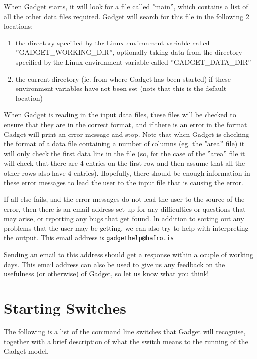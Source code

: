 \documentclass[10pt,twoside]{book}
\begin{document}
\bigskip
When Gadget starts, it will look for a file called ''main'', which contains a list of all the other data files required.  Gadget will search for this file in the following 2 locations:

\begin{enumerate}
\item the directory specified by the Linux environment variable called ''GADGET\_WORKING\_DIR'', optionally taking data from the directory specified by the Linux environment variable called ''GADGET\_DATA\_DIR''
\item the current directory (ie. from where Gadget has been started) if these environment variables have not been set (note that this is the default location)
\end{enumerate}

When Gadget is reading in the input data files, these files will be checked to ensure that they are in the correct format, and if there is an error in the format Gadget will print an error message and stop.  Note that when Gadget is checking the format of a data file containing a number of columns (eg. the ''area'' file) it will only check the first data line in the file (so, for the case of the ''area'' file it will check that there are 4 entries on the first row and then assume that all the other rows also have 4 entries).  Hopefully, there should be enough information in these error messages to lead the user to the input file that is causing the error.

\bigskip
If all else fails, and the error messages do not lead the user to the source of the error, then there is an email address set up for any difficulties or questions that may arise, or reporting any bugs that get found.  In addition to sorting out any problems that the user may be getting, we can also try to help with interpreting the output.  This email address is {\tt gadgethelp@hafro.is}

\bigskip
Sending an email to this address should get a response within a couple of working days.  This email address can also be used to give us any feedback on the usefulness (or otherwise) of Gadget, so let us know what you think!

\section{Starting Switches}\label{sec:starting}
The following is a list of the command line switches that Gadget will recognise, together with a brief description of what the switch means to the running of the Gadget model.
\end{document}
